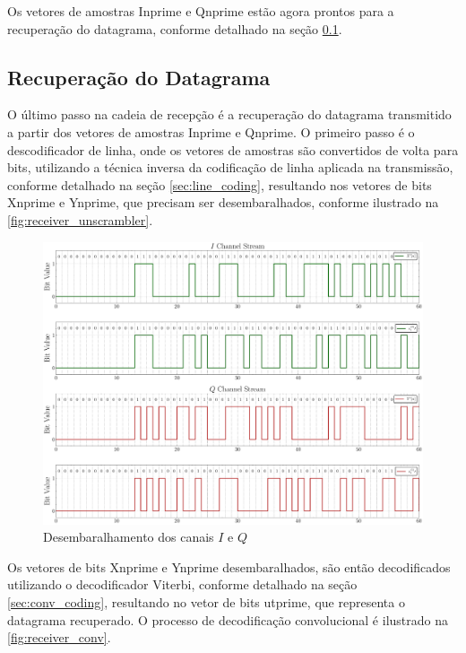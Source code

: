 Os vetores de amostras \gls{Inprime} e \gls{Qnprime} estão agora prontos para a recuperação do datagrama, conforme detalhado na seção \ref{sec:decodificacao_convolucional}.

\subsection{Recuperação do Datagrama}\label{sec:decodificacao_convolucional}

O último passo na cadeia de recepção é a recuperação do datagrama transmitido a partir dos vetores de amostras \gls{Inprime} e \gls{Qnprime}. O primeiro passo é o descodificador de linha, onde os vetores de amostras são convertidos de volta para bits, utilizando a técnica inversa da codificação de linha aplicada na transmissão, conforme detalhado na seção \ref{sec:line_coding}, resultando nos vetores de bits \gls{Xnprime} e \gls{Ynprime}, que precisam ser desembaralhados, conforme ilustrado na \autoref{fig:receiver_unscrambler}.

\begin{figure}[H]
	\centering
	\caption{Desembaralhamento dos canais $I$ e $Q$}\label{fig:receiver_unscrambler}
	\includegraphics[width=\linewidth]{assets/cap3/receiver_descrambler_time.pdf}
\end{figure}

Os vetores de bits \gls{Xnprime} e \gls{Ynprime} desembaralhados, são então decodificados utilizando o decodificador Viterbi, conforme detalhado na seção \ref{sec:conv_coding}, resultando no vetor de bits \gls{utprime}, que representa o datagrama recuperado. O processo de decodificação convolucional é ilustrado na \autoref{fig:receiver_conv}.

